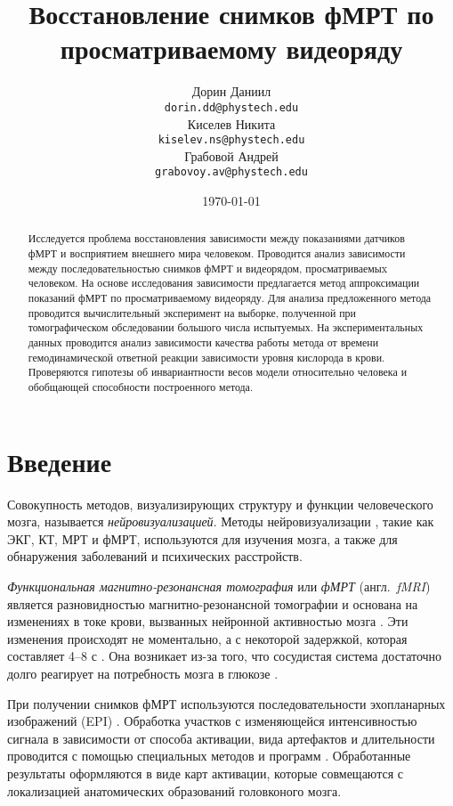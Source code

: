 \documentclass[a4paper, 12pt]{extarticle}
\title{Восстановление снимков фМРТ по просматриваемому видеоряду}
\author{
	Дорин Даниил \\
	\texttt{dorin.dd@phystech.edu} \\
	\And
	Киселев Никита \\
	\texttt{kiselev.ns@phystech.edu} \\
	\And
	Грабовой Андрей \\
	\texttt{grabovoy.av@phystech.edu}
}
\date{\today}
\begin{document}
\maketitle

\begin{abstract}

	Исследуется проблема восстановления зависимости между показаниями датчиков фМРТ
	и восприятием внешнего мира человеком.
	Проводится анализ зависимости между последовательностью снимков фМРТ и видеорядом,
	просматриваемыx человеком.
	На основе исследования зависимости предлагается метод аппроксимации показаний фМРТ по
	просматриваемому видеоряду.
	Для анализа предложенного метода проводится вычислительный эксперимент на
	выборке, полученной при томографическом обследовании большого числа испытуемых.
	На экспериментальных данных проводится анализ зависимости 
	качества работы метода от времени гемодинамической ответной реакции
	зависимости уровня кислорода в крови.
	Проверяются гипотезы об инвариантности весов модели относительно человека
	и обобщающей способности построенного метода.

\end{abstract}



\section{Введение}

Совокупность методов, визуализирующих структуру и функции человеческого мозга,
называется \textit{нейровизуализацией}. Методы нейровизуализации \citep{puras2014neurovisualization}, такие как ЭКГ, КТ, МРТ и фМРТ,
используются для изучения мозга, а также для обнаружения заболеваний и психических расстройств.

\textit{Функциональная магнитно-резонансная томография} или \textit{фМРТ} (англ.~\textit{fMRI})
является разновидностью магнитно-резонансной томографии и основана на изменениях в токе крови,
вызванных нейронной активностью мозга \citep{Glover2011}.
Эти изменения происходят не моментально, а с некоторой задержкой,
которая составляет 4--8 с \citep{Bandettini1992}.
Она возникает из-за того, что сосудистая система достаточно долго реагирует
на потребность мозга в глюкозе \citep{Ogawa1990, LEBIHAN1995231, Logothetis2003}. 

При получении снимков фМРТ используются последовательности
эхопланарных изображений (EPI) \citep{Connelly1993, Kwong1992, Ogawa1992}.
Обработка участков с изменяющейся интенсивностью сигнала в
зависимости от способа активации, вида артефактов и длительности
проводится с помощью специальных методов и программ 
\citep{Bandettini1992, BAUDENDISTEL1995701, COX1996162}.
Обработанные результаты оформляются в виде карт активации,
которые совмещаются с локализацией анатомических образований
головконого мозга.
\end{document}
